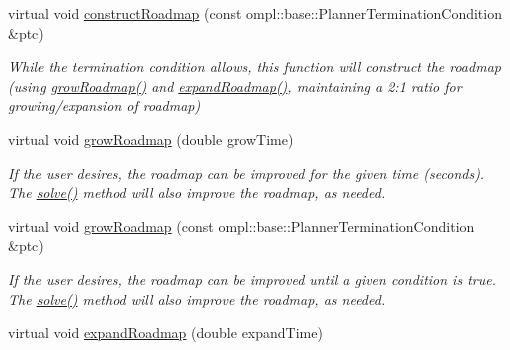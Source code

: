 \begin{DoxyCompactItemize}
\item 
\hypertarget{class_f_i_r_m_a5f2e6a8c5dac3a0629f1dd0ac2313b9c}{virtual void \hyperlink{class_f_i_r_m_a5f2e6a8c5dac3a0629f1dd0ac2313b9c}{construct\-Roadmap} (const ompl\-::base\-::\-Planner\-Termination\-Condition \&ptc)}\label{class_f_i_r_m_a5f2e6a8c5dac3a0629f1dd0ac2313b9c}

\begin{DoxyCompactList}\small\item\em \-While the termination condition allows, this function will construct the roadmap (using \hyperlink{class_f_i_r_m_a947186c6e6be0b513efe0e0b476fef88}{grow\-Roadmap()} and \hyperlink{class_f_i_r_m_ad9cd5472a8bd1b1fcb83763128f7fd75}{expand\-Roadmap()}, maintaining a 2\-:1 ratio for growing/expansion of roadmap) \end{DoxyCompactList}\item 
\hypertarget{class_f_i_r_m_a947186c6e6be0b513efe0e0b476fef88}{virtual void \hyperlink{class_f_i_r_m_a947186c6e6be0b513efe0e0b476fef88}{grow\-Roadmap} (double grow\-Time)}\label{class_f_i_r_m_a947186c6e6be0b513efe0e0b476fef88}

\begin{DoxyCompactList}\small\item\em \-If the user desires, the roadmap can be improved for the given time (seconds). \-The \hyperlink{class_f_i_r_m_a02f3c98de4840594193ba5bf7ff3ca63}{solve()} method will also improve the roadmap, as needed. \end{DoxyCompactList}\item 
\hypertarget{class_f_i_r_m_ae8e741b0af39a64d34dcfa4f29c0e509}{virtual void \hyperlink{class_f_i_r_m_ae8e741b0af39a64d34dcfa4f29c0e509}{grow\-Roadmap} (const ompl\-::base\-::\-Planner\-Termination\-Condition \&ptc)}\label{class_f_i_r_m_ae8e741b0af39a64d34dcfa4f29c0e509}

\begin{DoxyCompactList}\small\item\em \-If the user desires, the roadmap can be improved until a given condition is true. \-The \hyperlink{class_f_i_r_m_a02f3c98de4840594193ba5bf7ff3ca63}{solve()} method will also improve the roadmap, as needed. \end{DoxyCompactList}\item 
\hypertarget{class_f_i_r_m_ad9cd5472a8bd1b1fcb83763128f7fd75}{virtual void \hyperlink{class_f_i_r_m_ad9cd5472a8bd1b1fcb83763128f7fd75}{expand\-Roadmap} (double expand\-Time)}\label{class_f_i_r_m_ad9cd5472a8bd1b1fcb83763128f7fd75}


\end{DoxyCompactItemize}
